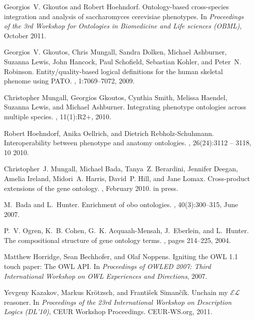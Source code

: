 \documentclass[11pt]{article}
\begin{document}
\begin{thebibliography}{10}
Georgios~V. Gkoutos and Robert Hoehndorf.
\newblock Ontology-based cross-species integration and analysis of
  saccharomyces cerevisiae phenotypes.
\newblock In {\em Proceedings of the 3rd Workshop for Ontologies in Biomedicine
  and Life sciences (OBML)}, October 2011.

Georgios~V. Gkoutos, Chris Mungall, Sandra Dolken, Michael Ashburner, Suzanna
  Lewis, John Hancock, Paul Schofield, Sebastian Kohler, and Peter~N. Robinson.
\newblock Entity/quality-based logical definitions for the human skeletal
  phenome using {PATO}.
, 1:7069--7072, 2009.

Christopher Mungall, Georgios Gkoutos, Cynthia Smith, Melissa Haendel, Suzanna
  Lewis, and Michael Ashburner.
\newblock Integrating phenotype ontologies across multiple species.
, 11(1):R2+, 2010.

Robert Hoehndorf, Anika Oellrich, and Dietrich Rebholz-Schuhmann.
\newblock Interoperability between phenotype and anatomy ontologies.
, 26(24):3112 -- 3118, 10 2010.

Christopher~J. Mungall, Michael Bada, Tanya~Z. Berardini, Jennifer Deegan,
  Amelia Ireland, Midori~A. Harris, David~P. Hill, and Jane Lomax.
\newblock Cross-product extensions of the gene ontology.
, February 2010.
\newblock in press.

M.~Bada and L.~Hunter.
\newblock Enrichment of obo ontologies.
, 40(3):300--315, June 2007.

P.~V. Ogren, K.~B. Cohen, G.~K. Acquaah-Mensah, J.~Eberlein, and L.~Hunter.
\newblock The compositional structure of gene ontology terms.
, pages 214--225, 2004.

Matthew Horridge, Sean Bechhofer, and Olaf Noppens.
\newblock Igniting the {OWL} 1.1 touch paper: The {OWL} {API}.
\newblock In {\em Proceedings of OWLED 2007: Third International Workshop on
  OWL Experiences and Directions}, 2007.

Yevgeny Kazakov, Markus Kr{\"o}tzsch, and Franti\v{s}ek Siman\v{c}\'{i}k.
\newblock Unchain my $\mathcal{EL}$ reasoner.
\newblock In {\em Proceedings of the 23rd International Workshop on Description
  Logics (DL'10)}, CEUR Workshop Proceedings. CEUR-WS.org, 2011.


\end{thebibliography}
\end{document}
